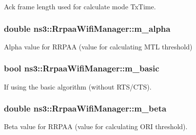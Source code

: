 Ack frame length used for calculate mode Tx\+Time. 

\subsubsection[{\texorpdfstring{m\+\_\+alpha}{m_alpha}}]{\setlength{\rightskip}{0pt plus 5cm}double ns3\+::\+Rrpaa\+Wifi\+Manager\+::m\+\_\+alpha\hspace{0.3cm}{\ttfamily [private]}}\hypertarget{classns3_1_1RrpaaWifiManager_ad2dee5b7cd74a92d50467b2bae11263c}{}\label{classns3_1_1RrpaaWifiManager_ad2dee5b7cd74a92d50467b2bae11263c}


Alpha value for R\+R\+P\+AA (value for calculating M\+TL threshold) 

\subsubsection[{\texorpdfstring{m\+\_\+basic}{m_basic}}]{\setlength{\rightskip}{0pt plus 5cm}bool ns3\+::\+Rrpaa\+Wifi\+Manager\+::m\+\_\+basic\hspace{0.3cm}{\ttfamily [private]}}\hypertarget{classns3_1_1RrpaaWifiManager_a253f22b8b3fb9452a710ef9ab8dbbd30}{}\label{classns3_1_1RrpaaWifiManager_a253f22b8b3fb9452a710ef9ab8dbbd30}


If using the basic algorithm (without R\+T\+S/\+C\+TS). 

\subsubsection[{\texorpdfstring{m\+\_\+beta}{m_beta}}]{\setlength{\rightskip}{0pt plus 5cm}double ns3\+::\+Rrpaa\+Wifi\+Manager\+::m\+\_\+beta\hspace{0.3cm}{\ttfamily [private]}}\hypertarget{classns3_1_1RrpaaWifiManager_a0b6ca1511f7b4e0bebea6418b8fbf4eb}{}\label{classns3_1_1RrpaaWifiManager_a0b6ca1511f7b4e0bebea6418b8fbf4eb}


Beta value for R\+R\+P\+AA (value for calculating O\+RI threshold). 

